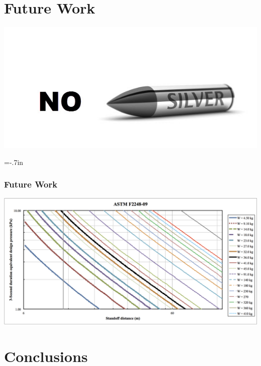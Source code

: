 \documentclass{beamer}
\begin{document}

\section[Future Work]{Future Work}


\begin{frame}
\includegraphics[width=\textwidth]{no_silver_bullet.jpg}
\end{frame}

\hoffset=-.7in %
\begin{frame}[plain]

\frametitle{Future Work}

\includegraphics[width=1.2\textwidth]{ASTM_F2248-09.png}

\end{frame}
\hoffset=0in %

\section[Conclusions]{Conclusions}
\end{document}
